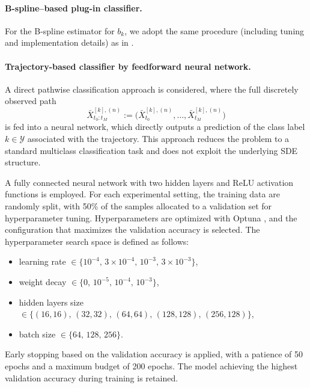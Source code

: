 \documentclass{article}
\theoremstyle{plain}
\theoremstyle{definition}
\theoremstyle{remark}
\newcommand{\calY}{\mathcal{Y}}
\begin{document}
\paragraph{B-spline–based plug-in classifier.}%
For the B-spline estimator for $b_k$, we adopt the same procedure (including tuning and implementation details) as in \citet{Denis2024}.



\paragraph{Trajectory-based classifier by feedforward neural network.}
A direct pathwise classification approach is considered, where the full discretely observed path
$$ \bar{X}^{[k],(n)}_{t_0:t_M}
 :=
 \big(
\bar X^{[k],(n)}_{t_0},
 \dots,
\bar X^{[k],(n)}_{t_M}
 \big)$$
is fed into a neural network, which directly outputs a prediction of the class label $k\in\calY$ associated with the trajectory. This approach reduces the problem to a standard multiclass classification task and does not exploit the underlying SDE structure.

A fully connected neural network with two hidden layers and ReLU activation functions is employed.
For each experimental setting, the training data are randomly split, with 50\% of the samples allocated to a validation set for hyperparameter tuning. Hyperparameters are optimized with Optuna \citep{akiba2019optuna}, and the configuration that maximizes the validation accuracy is selected. The hyperparameter search space is defined as follows: %
\begin{itemize}
    \item learning rate $\in \{10^{-4},\, 3\times10^{-4},\, 10^{-3},\, 3\times10^{-3}\}$,
    \item weight decay $\in\{0,\, 10^{-5},\, 
    10^{-4},\, 10^{-3}\}$,
    \item hidden layers size $\in\{(16,16),\, (32,32),\, (64,64),\, (128,128),\, (256,128)\}$,
    \item batch size $\in\{64,\, 128,\, 256\}$.
\end{itemize}
Early stopping based on the validation accuracy is applied, with a patience of 50 epochs and a maximum budget of 200 epochs. The model achieving the highest validation accuracy during training is retained. 
\end{document}
